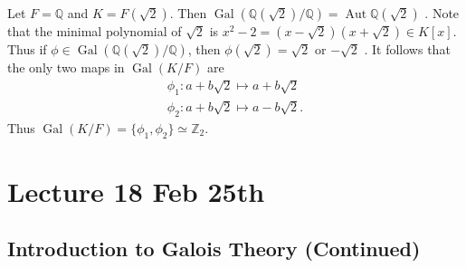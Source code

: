 \documentclass[notoc,notitlepage,nobib]{tufte-book}
\DeclareMathOperator{\Aut}{Aut}
\DeclareMathOperator{\Gal}{Gal}
\begin{document}
\begin{eg}
  Let $F = \mathbb{Q}$ and $K = F(\sqrt{2})$. Then $\Gal( \mathbb{Q}(\sqrt{2}) /
  \mathbb{Q}) = \Aut \mathbb{Q}(\sqrt{2})$ .
  Note that the minimal polynomial of $\sqrt{2}$ is $x^2 - 2 = (x - \sqrt{2})(x
  + \sqrt{2}) \in K[x]$. Thus if $\phi \in
  \Gal(\mathbb{Q}(\sqrt{2})/\mathbb{Q})$, then $\phi(\sqrt{2}) = \sqrt{2}$ or
  $-\sqrt{2}$ . It follows that the only two maps in $\Gal(K / F)$ are
  \begin{gather*}
    \phi_1 : a + b \sqrt{2} \mapsto a + b \sqrt{2} \\
    \phi_2 : a + b \sqrt{2} \mapsto a - b \sqrt{2}.
  \end{gather*}
  Thus $\Gal(K / F) = \{ \phi_1, \phi_2 \} \simeq \mathbb{Z}_2$.
\end{eg}



\chapter{Lecture 18 Feb 25th}%
\label{chp:lecture_18_feb_25th}

\section{Introduction to Galois Theory (Continued)}%
\label{sec:introduction_to_galois_theory_continued}
\end{document}
